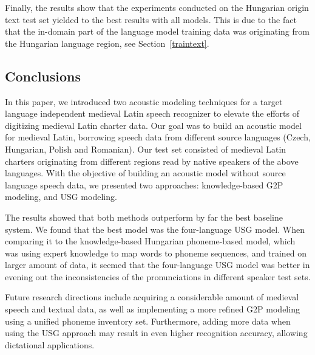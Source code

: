 \documentclass[runningheads,a4paper]{llncs}
\begin{document}
Finally, the results show that the experiments conducted on the Hungarian origin text test set yielded to the best results with all models.
This is due to the fact that the in-domain part of the language model training data was originating from the Hungarian language region, see Section~\ref{traintext}.
\subsection{Conclusions}
In this paper, we introduced two acoustic modeling techniques for a target language independent medieval Latin speech recognizer to elevate the efforts of digitizing medieval Latin charter data.
Our goal was to build an acoustic model for medieval Latin, borrowing speech data from different source languages (Czech, Hungarian, Polish and Romanian).
Our test set consisted of medieval Latin charters originating from different regions read by native speakers of the above languages.
With the objective of building an acoustic model without source language speech data, we presented two approaches: knowledge-based G2P modeling, and USG modeling.

The results showed that both methods outperform by far the best baseline system. 
We found that the best model was the four-language USG model.
When comparing it to the knowledge-based Hungarian phoneme-based model, which was using expert knowledge to map words to phoneme sequences, and trained on larger amount of data, it seemed that the four-language USG model was better in evening out the inconsistencies of the pronunciations in different speaker test sets.

Future research directions include acquiring a considerable amount of medieval speech and textual data, as well as implementing a more refined G2P modeling using a unified phoneme inventory set.
Furthermore, adding more data when using the USG approach may result in even higher recognition accuracy, allowing dictational applications.



\end{document}
